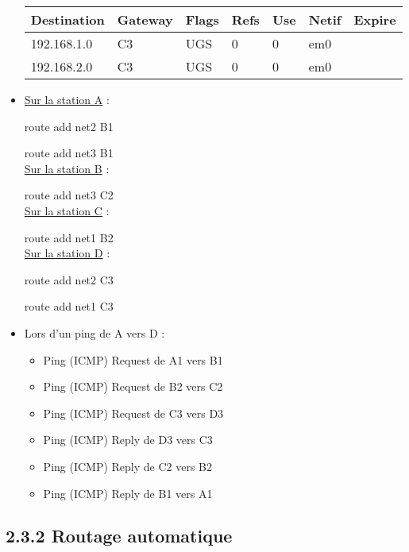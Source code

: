\documentclass{article}
\begin{document}
\begin{itemize}
\begin{tabular}{|p{2cm}|p{2cm}|p{1cm}|p{1cm}|p{1cm}|p{2cm}|p{2cm}|}
\hline
Destination & Gateway & Flags & Refs & Use & Netif & Expire\\
\hline
192.168.1.0 & C3 & UGS & 0 & 0 & em0 & \\ 
\hline
192.168.2.0 & C3 & UGS & 0 & 0 & em0 & \\ 
\hline
\end{tabular}

\item \underline{Sur la station A} :

route add net2 B1

route add net3 B1\\

\underline{Sur la station B} :

route add net3 C2\\

\underline{Sur la station C} :

route add net1 B2\\

\underline{Sur la station D} :

route add net2 C3

route add net1 C3\\

\item Lors d'un ping de A vers D :
	\begin{itemize}
		\item Ping (ICMP) Request de A1 vers B1
		\item Ping (ICMP) Request de B2 vers C2
		\item Ping (ICMP) Request de C3 vers D3
		\item Ping (ICMP) Reply de D3 vers C3
		\item Ping (ICMP) Reply de C2 vers B2
		\item Ping (ICMP) Reply de B1 vers A1
	\end{itemize}
\end{itemize}

\subsection*{2.3.2 Routage automatique}
\end{document}
